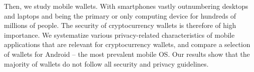 Then, we study mobile wallets.
With smartphones vastly outnumbering desktops and laptops and being the primary or only computing device for hundreds of millions of people.
The security of cryptocurrency wallets is therefore of high importance.
We systematize various privacy-related characteristics of mobile applications that are relevant for cryptocurrency wallets, and compare a selection of  wallets for Android -- the most prevalent mobile OS.
Our results show that the majority of wallets do not follow all security and privacy guidelines.

